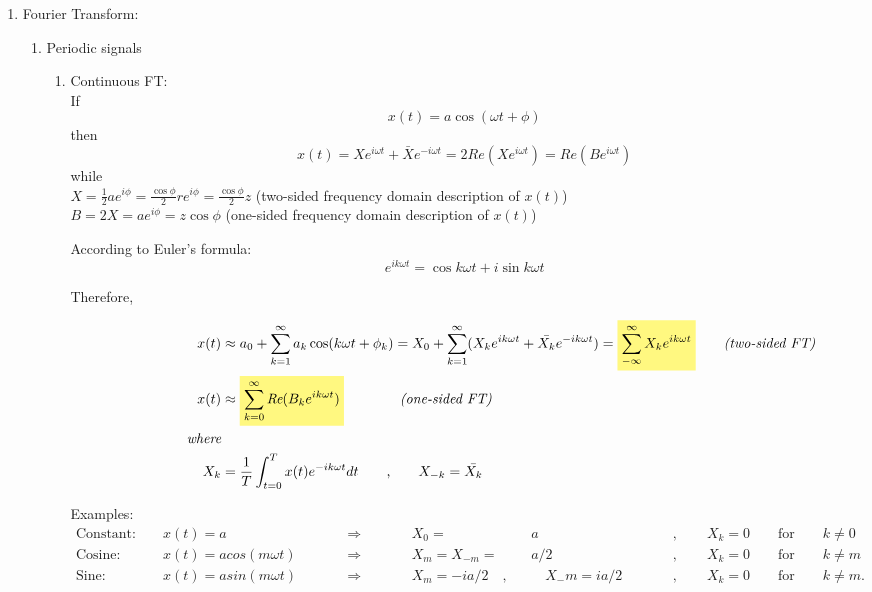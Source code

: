 \documentclass{amsart}
\theoremstyle{definition}
\newcommand{\highlight}[1]{%
  \colorbox{yellow!50}{$\displaystyle#1$}}
\begin{document}
\begin{enumerate}
\vspace{.5cm}
\hrule
\vspace{.5cm}

\item Fourier Transform:\\ 
\bigskip

\begin{enumerate}
\item Periodic signals\\
\begin{enumerate}
 \item Continuous FT:\\
If
\[ x(t) = a \cos (\omega t + \phi)\]
then
\[x(t) = Xe^{i \omega t} + \bar{X}e^{-i \omega t}= 2Re(Xe^{i\omega t}) = Re (Be^{i \omega t})\]
\bigskip
while\\
$X= \frac{1}{2}ae^{i\phi} = \frac{\cos{\phi}}{2}re^{i\phi} = \frac{\cos{\phi}}{2}z$  (two-sided frequency domain description of $x(t)$)\text{,}\\
\vspace{.5cm}
$B = 2X = ae^{i\phi} = z\cos{\phi}$ (one-sided frequency domain description of $x(t)$)\\
\bigskip

According to Euler's formula:
\[e^{ik \omega t} = \cos{k \omega t} + i \sin {k \omega t} \]

Therefore,

\begin{align*}
\qquad\qquad\qquad x(t) &\approx a_0 + \sum_{k=1}^{\infty} a_k \cos (k \omega t + \phi_k) = X_0 + \sum_{k=1}^{\infty}(X_ke^{ik \omega t} + \bar{X_k}e^{-ik \omega t}) = \highlight{\sum_{-\infty}^{\infty}X_ke^{ik \omega t}} \qquad \textit{(two-sided FT)}\\
x(t) &\approx \highlight{\sum_{k = 0}^{\infty} \textit{Re} (B_ke^{ik \omega t})} \qquad\qquad \textit{(one-sided FT)}\\
  \textit{where}\\
 X_k &= \frac{1}{T} \int_{t=0}^{T} x(t)e^{-ik \omega t} dt \qquad\text{,}\qquad X_{-k} = \bar{X_k}
\end{align*}

Examples:\\
\begin{align*}
\text{Constant: }&& x(t) = a \qquad\qquad&&  \qquad\Rightarrow&&\qquad X_0 =&& a \qquad&&, \qquad X_k = 0 \qquad\text{for}\qquad k \neq 0\\
\text{Cosine: }&& x(t) = acos(m \omega t)&& \qquad\Rightarrow&&\qquad X_m = X_{-m} =&& a/2 \qquad&&, \qquad X_k = 0 \qquad\text{for}\qquad k \neq m\\
\text{Sine: }&& x(t) = asin(m \omega t)&& \qquad\Rightarrow&&\qquad X_m = -ia/2 \quad,&&\quad X_-m = ia/2 \qquad&&, \qquad X_k = 0 \qquad\text{for}\qquad k \neq m.
\end{align*}


\end{enumerate}
\end{enumerate}
\end{enumerate}
\end{document}
